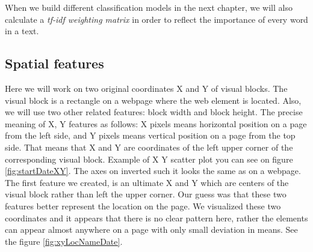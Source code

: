 When we build different classification models in the next chapter, we will also calculate a \textit{tf-idf weighting matrix} in order to reflect the importance of every word in a text.

\subsection{Spatial features}

Here we will work on two original coordinates X and Y of visual blocks. The visual block is a rectangle on a webpage where the web element is located. Also, we will use two other related features: block width and block height. The precise meaning of X, Y features as follows: X pixels means horizontal position on a page from the left side, and Y pixels means vertical position on a page from the top side. That means that X and Y are coordinates of the left upper corner of the corresponding visual block. Example of X Y scatter plot you can see on figure \ref{fig:startDateXY}. The axes on inverted such it looks the same as on a webpage.\\

The first feature we created, is an ultimate X and Y which are centers of the visual block rather than left the upper corner. Our guess was that these two features better represent the location on the page. We visualized these two coordinates and it appears that there is no clear pattern here, rather the elements can appear almost anywhere on a page with only small deviation in means. See the figure \ref{fig:xyLocNameDate}.\\

